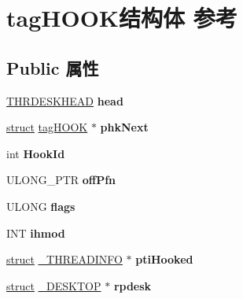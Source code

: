 \hypertarget{structtag_h_o_o_k}{}\section{tag\+H\+O\+O\+K结构体 参考}
\label{structtag_h_o_o_k}
\subsection*{Public 属性}
\begin{DoxyCompactItemize}
\item 
\mbox{\label{structtag_h_o_o_k_a400f635c605770295bef260e861a9e69}} 
\hyperlink{struct___t_h_r_d_e_s_k_h_e_a_d}{T\+H\+R\+D\+E\+S\+K\+H\+E\+AD} {\bfseries head}
\item 
\mbox{\label{structtag_h_o_o_k_a346c0c748c0c1e9b881e06afaee67689}} 
\hyperlink{interfacestruct}{struct} \hyperlink{structtag_h_o_o_k}{tag\+H\+O\+OK} $\ast$ {\bfseries phk\+Next}
\item 
\mbox{\label{structtag_h_o_o_k_a9e7acbff5a4285dfccd2628ad57e8b11}} 
int {\bfseries Hook\+Id}
\item 
\mbox{\label{structtag_h_o_o_k_a8a269d235e4d25c2df1c42e013b7fb52}} 
U\+L\+O\+N\+G\+\_\+\+P\+TR {\bfseries off\+Pfn}
\item 
\mbox{\label{structtag_h_o_o_k_a01d38f1dcb871fe0f6079baf4526e779}} 
U\+L\+O\+NG {\bfseries flags}
\item 
\mbox{\label{structtag_h_o_o_k_ada7eabbee4959172104d18b3f4c4c449}} 
I\+NT {\bfseries ihmod}
\item 
\mbox{\label{structtag_h_o_o_k_ab12d539533a5a4766edb8c956eca1b68}} 
\hyperlink{interfacestruct}{struct} \hyperlink{struct___t_h_r_e_a_d_i_n_f_o}{\+\_\+\+T\+H\+R\+E\+A\+D\+I\+N\+FO} $\ast$ {\bfseries pti\+Hooked}
\item 
\mbox{\label{structtag_h_o_o_k_ac075c19fcb4d333efd3908f0ad86744e}} 
\hyperlink{interfacestruct}{struct} \hyperlink{struct___d_e_s_k_t_o_p}{\+\_\+\+D\+E\+S\+K\+T\+OP} $\ast$ {\bfseries rpdesk}
\item 

\end{DoxyCompactItemize}
